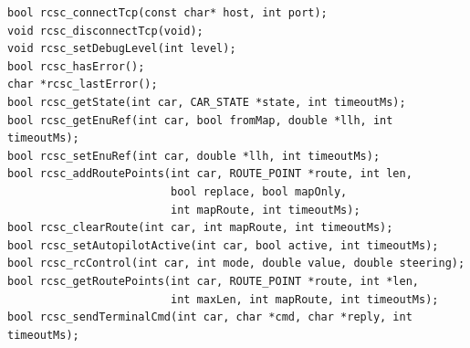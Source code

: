 \documentclass[12pt]{article} %
\def\printtodos{0}
\newcommand{\todo}[1]{
  \if\printtodos1
      {\color{red} \textbf{TODO:} #1}
  \fi}
\begin{document}
\begin{Verbatim}
bool rcsc_connectTcp(const char* host, int port);
void rcsc_disconnectTcp(void);
void rcsc_setDebugLevel(int level);
bool rcsc_hasError();
char *rcsc_lastError();
bool rcsc_getState(int car, CAR_STATE *state, int timeoutMs);
bool rcsc_getEnuRef(int car, bool fromMap, double *llh, int timeoutMs);
bool rcsc_setEnuRef(int car, double *llh, int timeoutMs);
bool rcsc_addRoutePoints(int car, ROUTE_POINT *route, int len,
                         bool replace, bool mapOnly,
                         int mapRoute, int timeoutMs);
bool rcsc_clearRoute(int car, int mapRoute, int timeoutMs);
bool rcsc_setAutopilotActive(int car, bool active, int timeoutMs);
bool rcsc_rcControl(int car, int mode, double value, double steering);
bool rcsc_getRoutePoints(int car, ROUTE_POINT *route, int *len,
                         int maxLen, int mapRoute, int timeoutMs);
bool rcsc_sendTerminalCmd(int car, char *cmd, char *reply, int timeoutMs);
\end{Verbatim} 









\end{document}
